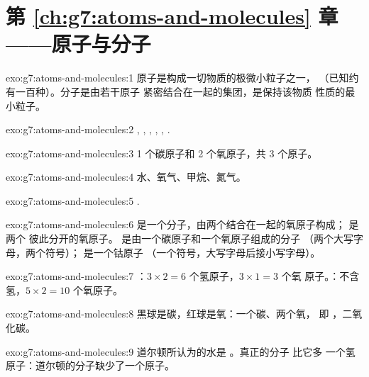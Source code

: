 \section*{第 \ref{ch:g7:atoms-and-molecules} 章——原子与分子}

\begin{solution}{exo:g7:atoms-and-molecules:1}
原子是构成一切物质的极微小粒子之一，
（已知约有一百种）。分子是由若干原子
紧密结合在一起的集团，是保持该物质
性质的最小粒子。
\end{solution}

\begin{solution}{exo:g7:atoms-and-molecules:2}
, , , , , .
\end{solution}

\begin{solution}{exo:g7:atoms-and-molecules:3}
1 个碳原子和 2 个氧原子，共 3 个原子。
\end{solution}

\begin{solution}{exo:g7:atoms-and-molecules:4}
水、氧气、甲烷、氮气。
\end{solution}

\begin{solution}{exo:g7:atoms-and-molecules:5}
.
\end{solution}

\begin{solution}{exo:g7:atoms-and-molecules:6}
 是一个分子，由两个结合在一起的氧原子构成； 是两个
彼此分开的氧原子。 是由一个碳原子和一个氧原子组成的分子
（两个大写字母，两个符号）； 是一个钴原子
（一个符号，大写字母后接小写字母）。
\end{solution}

\begin{solution}{exo:g7:atoms-and-molecules:7}
：$3\times 2 = 6$ 个氢原子，$3\times 1 = 3$ 个氧
原子。：不含氢，$5\times 2 = 10$ 个氧原子。
\end{solution}

\begin{solution}{exo:g7:atoms-and-molecules:8}
黑球是碳，红球是氧：一个碳、两个氧，
即 ，二氧化碳。
\end{solution}

\begin{solution}{exo:g7:atoms-and-molecules:9}
道尔顿所认为的水是 。真正的分子  比它多
一个氢原子：道尔顿的分子缺少了一个原子。
\end{solution}

